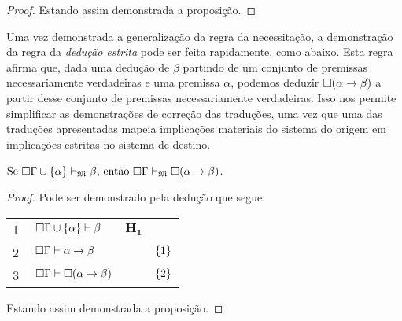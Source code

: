 \begin{tcolorbox}[enhanced jigsaw, breakable, sharp corners, colframe=black, colback=white, boxrule=0.5pt, left=1.5mm, right=1.5mm, top=1.5mm, bottom=1.5mm]
\begin{theorem}
\begin{proof}
            \vspace{0.5\baselineskip}
            Estando assim demonstrada a proposição.
        \end{proof}
    \end{theorem}
    \end{tcolorbox}

    \vspace{.5\baselineskip}
    Uma vez demonstrada a generalização da regra da necessitação, a demonstração da regra da \emph{dedução estrita} pode ser feita rapidamente, como abaixo.
    Esta regra afirma que, dada uma dedução de $\beta$ partindo de um conjunto de premissas necessariamente verdadeiras e uma premissa $\alpha$, podemos deduzir $\Box(\alpha\to\beta)$ a partir desse conjunto de premissas necessariamente verdadeiras.
    Isso nos permite simplificar as demonstrações de correção das traduções, uma vez que uma das traduções apresentadas mapeia implicações materiais do sistema do origem em implicações estritas no sistema de destino.

    \vspace{.5\baselineskip}
    \begin{tcolorbox}[enhanced jigsaw, breakable, sharp corners, colframe=black, colback=white, boxrule=0.5pt, left=1.5mm, right=1.5mm, top=1.5mm, bottom=1.5mm]
    \begin{lemma}\label{strict.deduction}
        $\text{Se }\Box\Gamma\cup\left\{\alpha\right\}\mathrel{\vdash}_{\mathfrak{M}}\beta\text{, então }\Box\Gamma\mathrel{\vdash}_{\mathfrak{M}}\Box(\alpha\to\beta)$.
        \begin{proof}
            Pode ser demonstrado pela dedução que segue.

            \vspace{0.5\baselineskip}
            \footnotesize
            \setlength{\rowskip}{0.5\baselineskip}
            \begin{xltabular}{\textwidth}{r | X l l}
                \scriptsize{\phantom{0}1}\phantom{ } & $\ \nec\Gamma\cup\set{\alpha}\entails\beta$ & $\mathbf{H_1}$\phantom{1} & \\[\rowskip]
                \scriptsize{\phantom{0}2}\phantom{ } & $\ \nec\Gamma\entails\alpha\to\beta$        &       & $\left\{1\right\}$\\[\rowskip]
                \scriptsize{\phantom{0}3}\phantom{ } & $\ \nec\Gamma\entails\nec(\alpha\to\beta)$  &  & $\left\{2\right\}$
            \end{xltabular}
            \normalsize

            \vspace{0.5\baselineskip}
            Estando assim demonstrada a proposição.
        \end{proof}
    \end{lemma}
    \end{tcolorbox}

